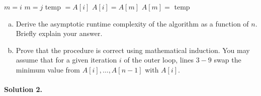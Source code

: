 \documentclass[11pt]{article}
\begin{document}
\begin{algorithmic}[1]
        \State $m = i$
                \State $m = j$
            \EndIf
        \EndFor
        \State temp $=A[i]$
        \State $A[i] = A[m]$
        \State $A[m] =$ temp
    \EndFor
\EndProcedure
\end{algorithmic}

\begin{enumerate}[(a)]
    \item Derive the asymptotic runtime complexity of the  algorithm as a function of $n$. Briefly explain your answer.
    
    \item Prove that the  procedure is correct using mathematical induction. You may assume that for a given iteration $i$ of the outer loop, lines $3-9$ swap the minimum value from $A[i], \dots, A[n-1]$ with $A[i]$.
\end{enumerate}


\paragraph{Solution 2.}
\end{document}
